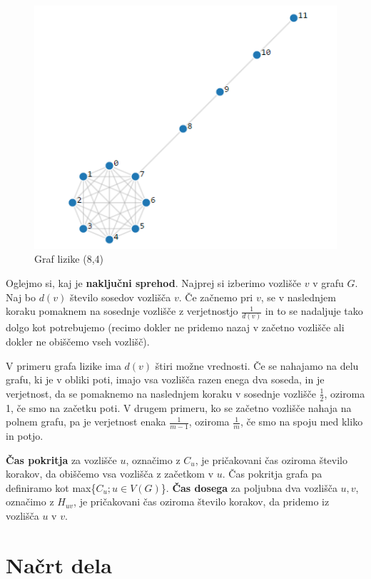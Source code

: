 \documentclass[12pt,a4paper]{amsart}
\begin{document}
\begin{figure}[h]
\includegraphics[width=\textwidth]{Lollipop_graph.png}
\caption{Graf lizike (8,4)}
\end{figure}
Oglejmo si, kaj je \textbf{naključni sprehod}. Najprej si izberimo vozlišče $v$ v grafu $G$. Naj bo $d(v)$ število sosedov
 vozlišča $v$. Če začnemo pri $v$, se v naslednjem koraku pomaknem na 
sosednje vozlišče z verjetnostjo $\frac{1}{d(v)}$ in to se nadaljuje tako dolgo kot potrebujemo 
(recimo dokler ne pridemo nazaj v začetno vozlišče ali dokler ne obiščemo vseh vozlišč).

V primeru grafa lizike ima $d(v)$ štiri možne vrednosti. Če se nahajamo na
delu grafu, ki je v obliki poti, imajo vsa vozlišča razen enega dva soseda, in je verjetnost, da
se pomaknemo na naslednjem koraku v sosednje vozlišče $\frac{1}{2}$, oziroma 1, če smo na začetku poti.
V drugem primeru, ko se začetno vozlišče nahaja na polnem grafu, pa je verjetnost enaka $\frac{1}{m-1}$, oziroma
$\frac{1}{m}$, če smo na spoju med kliko in potjo. 

\textbf{Čas pokritja} za vozlišče $u$, označimo z $C_u$, je pričakovani čas oziroma število korakov, da obiščemo vsa vozlišča z začetkom v $u$.
Čas pokritja grafa pa definiramo kot max\{$C_u;u\in V(G)$\}.
\textbf{Čas dosega} za poljubna dva vozlišča $u,v$, označimo z $H_{uv}$, je pričakovani čas oziroma število korakov, da 
pridemo iz vozlišča $u$ v $v$.


\section{Načrt dela}
\end{document}
